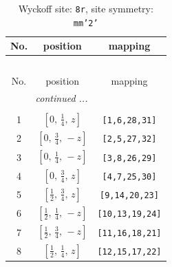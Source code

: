 \documentclass[fleqn,8pt]{jsarticle}
\begin{document}
\begin{longtable}{ccc}
\caption{Wyckoff site: {\tt 8r}, site symmetry: {\tt mm'2'}}
 \\
 \hline \hline
No. & position & mapping \\ \hline \endfirsthead

\multicolumn{2}{l}{\tablename\ \thetable{}} \\
 \hline \hline
No. & position & mapping \\ \hline \endhead

 \hline \hline
\multicolumn{2}{r}{\footnotesize\it continued ...} \\ \endfoot

 \hline \hline
\multicolumn{2}{r}{} \\ \endlastfoot

1 & $\left[ 0,\, \frac{1}{4},\, z \right]$ & {\tt [1,6,28,31]} \\ \hline
2 & $\left[ 0,\, \frac{3}{4},\, - z \right]$ & {\tt [2,5,27,32]} \\ \hline
3 & $\left[ 0,\, \frac{1}{4},\, - z \right]$ & {\tt [3,8,26,29]} \\ \hline
4 & $\left[ 0,\, \frac{3}{4},\, z \right]$ & {\tt [4,7,25,30]} \\ \hline
5 & $\left[ \frac{1}{2},\, \frac{3}{4},\, z \right]$ & {\tt [9,14,20,23]} \\ \hline
6 & $\left[ \frac{1}{2},\, \frac{1}{4},\, - z \right]$ & {\tt [10,13,19,24]} \\ \hline
7 & $\left[ \frac{1}{2},\, \frac{3}{4},\, - z \right]$ & {\tt [11,16,18,21]} \\ \hline
8 & $\left[ \frac{1}{2},\, \frac{1}{4},\, z \right]$ & {\tt [12,15,17,22]} \\
\end{longtable}
\renewcommand{\arraystretch}{1.2}
\end{document}
